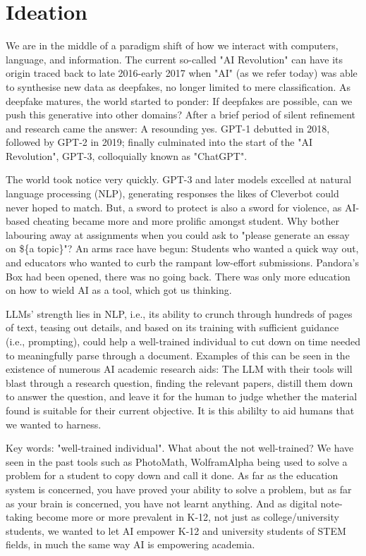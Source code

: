 \def\code#1{\texttt{#1}}

\section{Ideation}
We are in the middle of a paradigm shift of how we interact with computers, language, and
 information. The current so-called "AI Revolution" can have its origin traced back to late 2016-early 2017 when "AI"
 (as we refer today) was able to synthesise new data as deepfakes, no longer limited to mere classification. As
 deepfake matures, the world started to ponder: If deepfakes are possible, can we push this generative into other
 domains? After a brief period of silent refinement and research came the answer: A resounding yes. GPT-1 debutted in
 2018, followed by GPT-2 in 2019; finally culminated into the start of the "AI Revolution", GPT-3, colloquially known
 as "ChatGPT".

The world took notice very quickly. GPT-3 and later models excelled at natural language processing (NLP), generating
responses the likes of Cleverbot could never hoped to match. But, a sword to protect is also a sword for violence, as
AI-based cheating became more and more prolific amongst student. Why bother labouring away at assignments when you
could ask to "please generate an essay on \$\{a topic\}"? An arms race have begun: Students who wanted a quick way out,
and educators who wanted to curb the rampant low-effort submissions. Pandora's Box had been opened, there was no going
back. There was only more education on how to wield AI as a tool, which got us thinking.

LLMs' strength lies in NLP, i.e., its ability to crunch through hundreds of pages of text, teasing out details, and
based on its training with sufficient guidance (i.e., prompting), could help a well-trained individual to cut down on
time needed to meaningfully parse through a document. Examples of this can be seen in the existence of numerous AI
academic research aids: The LLM with their tools will blast through a research question, finding the relevant papers,
distill them down to answer the question, and leave it for the human to judge whether the material found is suitable
for their current objective. It is this abililty to aid humans that we wanted to harness.

Key words: "well-trained individual". What about the not well-trained? We have seen in the past tools such as PhotoMath,
WolframAlpha being used to solve a problem for a student to copy down and call it done. As far as the education system
is concerned, you have proved your ability to solve a problem, but as far as your brain is concerned, you have not
learnt anything. And as digital note-taking become more or more prevalent in K-12, not just as college/university
students, we wanted to let AI empower K-12 and university students of STEM fields, in much the same way AI is
empowering academia.

